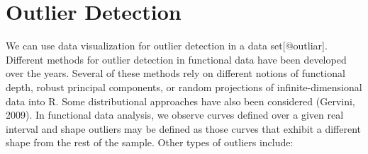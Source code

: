 \documentclass[]{book}
\theoremstyle{definition}
\theoremstyle{definition}
\theoremstyle{definition}
\theoremstyle{remark}
\begin{document}
\section{Outlier Detection}\label{outlier-detection}

We can use data visualization for outlier detection in a data
set{[}@outliar{]}. Different methods for outlier detection in functional
data have been developed over the years. Several of these methods rely
on different notions of functional depth, robust principal components,
or random projections of infinite-dimensional data into R. Some
distributional approaches have also been considered (Gervini, 2009). In
functional data analysis, we observe curves defined over a given real
interval and shape outliers may be defined as those curves that exhibit
a different shape from the rest of the sample. Other types of outliers
include:
\end{document}
